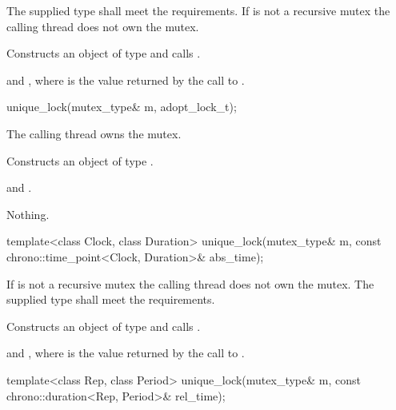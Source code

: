 \begin{itemdescr}
\pnum
\requires
The supplied  type shall meet the 
requirements.
If  is not a recursive mutex the calling thread does not own the mutex.

\pnum
\effects Constructs an object of type  and calls .

\pnum
\ensures {} and ,
where  is the value returned by the call to .
\end{itemdescr}

%
\begin{itemdecl}
unique_lock(mutex_type& m, adopt_lock_t);
\end{itemdecl}

\begin{itemdescr}
\pnum
\requires The calling thread owns the mutex.

\pnum
\effects Constructs an object of type .

\pnum
\ensures {} and .

\pnum
\throws Nothing.
\end{itemdescr}

%
\begin{itemdecl}
template<class Clock, class Duration>
  unique_lock(mutex_type& m, const chrono::time_point<Clock, Duration>& abs_time);
\end{itemdecl}

\begin{itemdescr}
\pnum
\requires If  is not a recursive mutex the calling thread
does not own the mutex. The supplied  type shall meet the
 requirements.

\pnum
\effects Constructs an object of type  and calls .

\pnum
\ensures {} and ,
where  is
the value returned by the call to .
\end{itemdescr}

%
\begin{itemdecl}
template<class Rep, class Period>
  unique_lock(mutex_type& m, const chrono::duration<Rep, Period>& rel_time);
\end{itemdecl}

